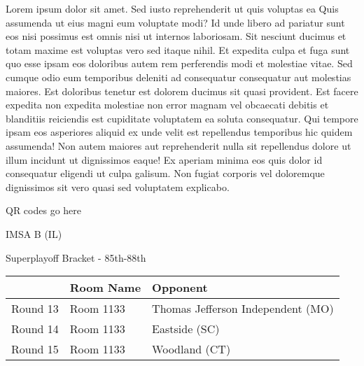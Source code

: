 \documentclass{article}%
\begin{document}
\vspace*{8pt}%
\linebreak%
\newline%
\newline%
Lorem ipsum dolor sit amet. Sed iusto reprehenderit ut quis voluptas ea Quis assumenda ut eius magni eum voluptate modi? Id unde libero ad pariatur sunt eos nisi possimus est omnis nisi ut internos laboriosam. Sit nesciunt ducimus et totam maxime est voluptas vero sed itaque nihil. Et expedita culpa et fuga sunt quo esse ipsam eos doloribus autem rem perferendis modi et molestiae vitae.\newline%
\newline%
Sed cumque odio eum temporibus deleniti ad consequatur consequatur aut molestias maiores. Est doloribus tenetur est dolorem ducimus sit quasi provident. Est facere expedita non expedita molestiae non error magnam vel obcaecati debitis et blanditiis reiciendis est cupiditate voluptatem ea soluta consequatur. Qui tempore ipsam eos asperiores aliquid ex unde velit est repellendus temporibus hic quidem assumenda!\newline%
\newline%
Non autem maiores aut reprehenderit nulla sit repellendus dolore ut illum incidunt ut dignissimos eaque! Ex aperiam minima eos quis dolor id consequatur eligendi ut culpa galisum. Non fugiat corporis vel doloremque dignissimos sit vero quasi sed voluptatem explicabo.\newline%
\newline%
%
\vspace*{30pt}%
\begin{center}%
\begin{Huge}%
QR codes go here%
\end{Huge}%
\end{center}%
\newpage%
\begin{center}%
\begin{Huge}%
IMSA B (IL)%
\end{Huge}%
\vspace*{8pt}%
\linebreak%
\begin{Large}%
Superplayoff Bracket {-} 85th{-}88th%
\end{Large}%
\end{center}%
%
\begin{tabularx}{\textwidth}{|c|Y|Y|}%
\hline%
&Room Name&Opponent\\%
\hline%
Round 13&Room 1133&Thomas Jefferson Independent (MO)\\%
Round 14&Room 1133&Eastside (SC)\\%
Round 15&Room 1133&Woodland (CT)\\%
\hline%
\end{tabularx}%
\end{document}
